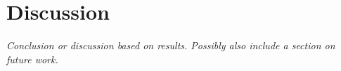
\chapter{Discussion}

\textit{Conclusion or discussion based on results.
Possibly also include a section on future work.}

\cleardoublepage